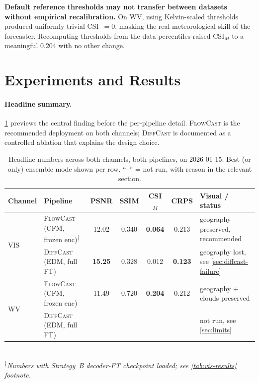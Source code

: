 \documentclass[11pt,a4paper]{article}
\begin{document}
\begin{finding}
\textbf{Default reference thresholds may not transfer between datasets
without empirical recalibration.} On WV, using
Kelvin-scaled thresholds produced uniformly trivial CSI~$=0$, masking the
real meteorological skill of the forecaster. Recomputing thresholds from
the data percentiles raised CSI$_M$ to a meaningful 0.204 with no other
change.
\end{finding}

\section{Experiments and Results}
\label{sec:experiments}

\paragraph{Headline summary.} \cref{tab:summary} previews the central
finding before the per-pipeline detail. \textsc{FlowCast} is the
recommended deployment on both channels; \textsc{DiffCast} is documented
as a controlled ablation that explains the design choice.

\begin{table}[h]
\centering\small
\caption{Headline numbers across both channels, both pipelines, on
2026-01-15. Best (or only) ensemble mode shown per row. ``--'' = not
run, with reason in the relevant section.}
\label{tab:summary}
\begin{tabular}{l|l|cccc|l}
\toprule
Channel & Pipeline & PSNR & SSIM & CSI$_M$ & CRPS & Visual / status \\
\midrule
\multirow{2}{*}{VIS}
 & \textsc{FlowCast} (CFM, frozen enc)\textsuperscript{$\dagger$} & 12.02 & 0.340 & \textbf{0.064} & 0.213 & geography preserved, recommended \\
 & \textsc{DiffCast} (EDM, full FT)    & \textbf{15.25} & 0.328 & 0.012 & \textbf{0.123} & geography lost, see \cref{sec:diffcast-failure} \\
\midrule
\multirow{2}{*}{WV}
 & \textsc{FlowCast} (CFM, frozen enc) & 11.49 & 0.720 & \textbf{0.204} & 0.212 & geography + clouds preserved \\
 & \textsc{DiffCast} (EDM, full FT)    &    &    &    &    & not run, see \cref{sec:limits} \\
\bottomrule
\end{tabular}
\\[0.4em]
\footnotesize\textsuperscript{$\dagger$}\textit{Numbers with Strategy~B
decoder-FT checkpoint loaded; see \cref{tab:vis-results} footnote.}
\end{table}
\end{document}
